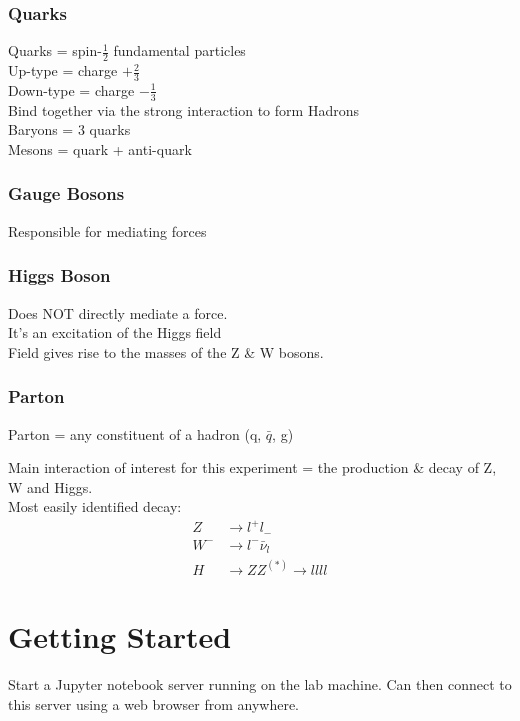 \subsubsection{Quarks}
Quarks = spin-$\frac{1}{2}$ fundamental particles\\
Up-type = charge $+\frac{2}{3}$\\
Down-type = charge $-\frac{1}{3}$\\
Bind together via the strong interaction to form Hadrons\\
Baryons = 3 quarks\\
Mesons = quark + anti-quark

\subsubsection{Gauge Bosons}
Responsible for mediating forces

\subsubsection{Higgs Boson}
Does NOT directly mediate a force.\\
It's an excitation of the Higgs field\\
Field gives rise to the masses of the Z \& W bosons. \\

\subsubsection{Parton}
Parton = any constituent of a hadron (q, $\bar{q}$, g)



Main interaction of interest for this experiment = the production \& decay of Z, W and Higgs.\\
Most easily identified decay:
\begin{align}
    Z &\rightarrow l^+ l_-
    \\
    W^- &\rightarrow l^- \bar{\nu}_l
    \\
    H &\rightarrow ZZ^{(*)} \rightarrow llll
\end{align}

\section{Getting Started}
Start a Jupyter notebook server running on the lab machine.
Can then connect to this server using a web browser from anywhere.

